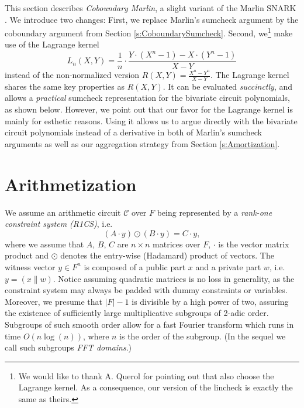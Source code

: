 \documentclass[10pt,article,oneside]{memoir}
\theoremstyle{definition}
\theoremstyle{remark}
\begin{document}

This section describes \textit{Coboundary Marlin}, a slight variant of the Marlin SNARK \cite{Marlin}.
We introduce two changes:
First, we replace Marlin's  sumcheck argument by the coboundary argument from Section \ref{s:CoboundarySumcheck}. 
Second, we\footnote{We would like to thank A. Querol for pointing out that \cite{Lunar} also choose the Lagrange kernel. 
As a consequence, our version of the lincheck is exactly the same as theirs.} make use of the Lagrange kernel
\begin{equation}
\label{e:LagrangeKernel}
L_n(X,Y) = \frac{1}{n}\cdot \frac{Y \cdot (X^n-1) - X\cdot (Y^n-1)}{X - Y}
\end{equation}
instead of the non-normalized version $R(X,Y)=\frac{X^n - Y^n}{X-Y}$. 
The Lagrange kernel shares the same key properties as $R(X,Y)$.
It can be evaluated \textit{succinctly}, and allows a \textit{practical} sumcheck representation for the bivariate circuit polynomials, as shown below.
However, we  point out that our favor for the Lagrange kernel is mainly for esthetic reasons.
Using it allows us to argue directly with the  bivariate circuit polynomials instead of a derivative in both of Marlin's sumcheck arguments as well as our aggregation strategy from Section \ref{s:Amortization}.


\section{Arithmetization}
\medskip
We assume an arithmetic circuit $\mathcal C$ over $F$ being represented by a \textit{rank-one constraint system (R1CS)}, i.e.
\begin{equation}
\label{e:R1CS}
(A\cdot y)\odot(B\cdot y) = C\cdot y,    
\end{equation}
where we assume that $A$, $B$, $C$ are $n\times n$ matrices over $F$, $\cdot$ is the vector matrix product and $\odot$ denotes the entry-wise (Hadamard) product of vectors.
The witness vector $y\in F^n$ is composed of a public part $x$ and a private part $w$, i.e.  $y=(x\|w)$.
Notice assuming quadratic matrices is no loss in generality, as the constraint system may always be padded with dummy constraints or variables. 
Moreover, we presume that $|F|-1$ is divisible by a high power of two, assuring the existence of sufficiently large multiplicative subgroups of 2-adic order.
Subgroups of such smooth order allow for a fast Fourier transform which runs in time $O(n\log(n))$, where $n$ is the order of the subgroup.
(In the sequel we call such subgroups \textit{FFT domains}.)
\end{document}
